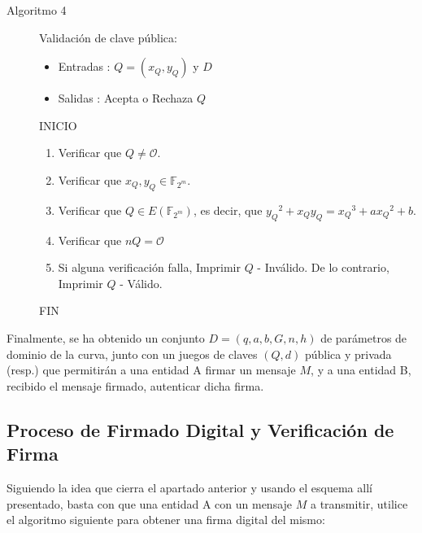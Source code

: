 \documentclass[11pt]{article}
\newcommand{\F}{\mathbb{F}}
\newcommand{\Fm}{\F_{2^m}}
\numberwithin{equation}{section} %
\numberwithin{figure}{section} %
\numberwithin{table}{section} %
\begin{document}
\begin{description}
			\item[Algoritmo 4] Validación de clave pública:%
			\begin{itemize}
				\item Entradas : $Q=(x_Q,y_Q)$ y $D$
				\item Salidas : Acepta o Rechaza $Q$
			\end{itemize}
			INICIO
			\begin{enumerate}
				\item Verificar que $Q\neq \mathcal{O}$.
				\item Verificar que $x_Q,y_Q\in\Fm$.
				\item Verificar que $Q\in E(\Fm)$, es decir, que ${y_Q}^2+x_Q y_Q={x_Q}^3+a{x_Q}^2+b$.
				\item Verificar que $nQ=\mathcal{O}$
				\item Si alguna verificación falla, Imprimir $Q$ - Inválido. De lo contrario, Imprimir $Q$ - Válido.
			\end{enumerate}
			FIN

\end{description}%


		Finalmente, se ha obtenido un conjunto $D=(q,a,b,G,n,h)$ de parámetros de dominio de la curva, junto con un juegos de claves $(Q,d)$ pública y privada (resp.) que permitirán a una entidad A firmar un mensaje $M$, y a una entidad B, recibido el mensaje firmado, autenticar dicha firma.

	\subsection{Proceso de Firmado Digital y Verificación de Firma}
	\label{PF}

		Siguiendo la idea que cierra el apartado anterior y usando el esquema allí presentado, basta con que una entidad A con un mensaje $M$ a transmitir, utilice el algoritmo siguiente para obtener una firma digital del mismo:
\end{document}
